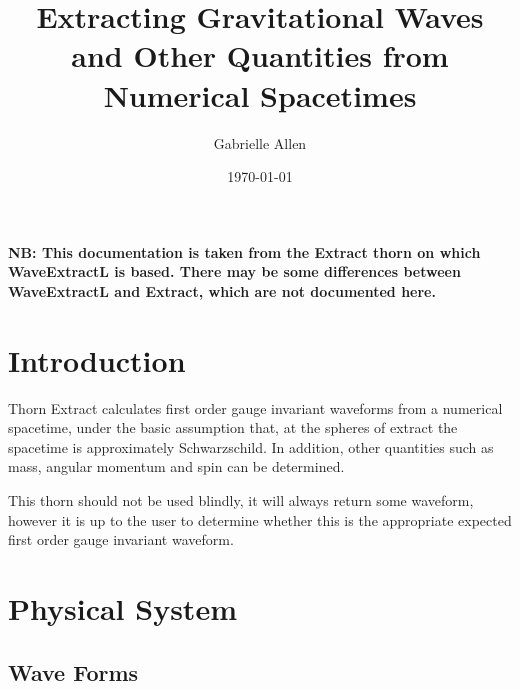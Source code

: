\documentclass{article}
\begin{document}
\author{Gabrielle Allen} 
\title{Extracting Gravitational Waves and Other Quantities from Numerical Spacetimes}

\date{\today}

\maketitle


\def\a   {\alpha}
\def\b   {\beta}
\def\p   {\phi}
\def\t   {\theta}
\def\Y   {Y_{lm}}
\def\Ys  {Y^*_{lm}}
\def\Yt  {Y_{lm,\theta}}
\def\Ytt {Y_{lm,\theta\theta}}
\def\Ytp {Y_{lm,\theta\phi}}
\def\Yp  {Y_{lm,\phi}}
\def\Ypp {Y_{lm,\phi\phi}}
\def\Yz  {Y_{l0}}
\def\Yzt {Y_{l0,\theta}}
\def\Yztt{Y_{l0,\theta\theta}}
\def\c   {\cos\theta}
\def\s   {\sin\theta}

\begin{abstract}

\end{abstract}

\textbf{NB: This documentation is taken from the Extract thorn on which WaveExtractL is based. There may be some differences between WaveExtractL and Extract, which are not documented here.}

\section{Introduction}

Thorn Extract calculates first order gauge invariant waveforms from a
numerical spacetime, under the basic assumption that, at the spheres
of extract the spacetime is approximately Schwarzschild. In addition,
other quantities such as mass, angular momentum and spin can be
determined.

This thorn should not be used blindly, it will always return some
waveform, however it is up to the user to determine whether this is
the appropriate expected first order gauge invariant waveform.

\section{Physical System}

\subsection{Wave Forms}
\end{document}
